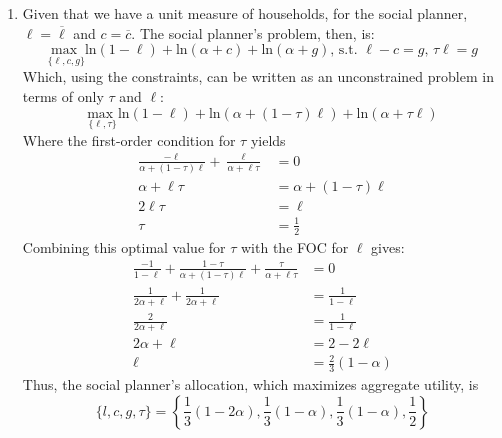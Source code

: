 \documentclass{article}
\newcommand{\loge}[1]{\text{ln}\left(#1\right)}
\newcommand{\usmax}[1]{\underset{\{#1\}}{\text{max }}}
\begin{document}
\begin{enumerate}
	\item Given that we have a unit measure of households, for the social planner, $\ell=\overline{\ell}$ and $c=\overline{c}$. The social planner's problem, then, is:
		\[
			\usmax{\ell,c,g}\loge{1-\ell} + \loge{\alpha + c} + \loge{\alpha + g}\text{, s.t. }\ell-c=g\text{, }\tau\ell=g
		\]
		Which, using the constraints, can be written as an unconstrained problem in terms of only $\tau$ and $\ell$:
		\[
			\usmax{\ell,\tau}\loge{1-\ell} + \loge{\alpha + (1-\tau)\ell} + \loge{\alpha + \tau\ell}	
		\]
		Where the first-order condition for $\tau$ yields
		\begin{align*}
			\frac{-\ell}{\alpha + (1-\tau)\ell} + \frac{\ell}{\alpha + \ell\tau} &= 0	\\
			\alpha + \ell\tau &= \alpha + (1-\tau)\ell \\
			2\ell\tau &= \ell \\
			\tau &= \frac{1}{2}
		\end{align*}
		Combining this optimal value for $\tau$ with the FOC for $\ell$ gives:
		\begin{align*}
			\frac{-1}{1-\ell} + \frac{1-\tau}{\alpha + (1-\tau)\ell}  + \frac{\tau}{\alpha + \ell\tau} &= 0	\\
			\frac{1}{2\alpha + \ell} + \frac{1}{2\alpha + \ell} &= \frac{1}{1-\ell}	\\
			\frac{2}{2\alpha + \ell} &= \frac{1}{1-\ell}	\\
			2\alpha + \ell &= 2 - 2\ell \\
			\ell &= \frac{2}{3}\left(1-\alpha\right)
		\end{align*}
		Thus, the social planner's allocation, which maximizes aggregate utility, is 
		\[
			{\{l,c,g,\tau\}=\left\{\frac{1}{3}\left(1-2\alpha\right),\frac{1}{3}\left(1-\alpha\right),\frac{1}{3}\left(1-\alpha\right),\frac{1}{2} \right\}}
		\]
		

\end{enumerate}
\end{document}
